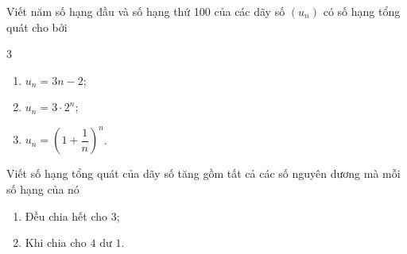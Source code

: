 \begin{bt}%
	Viết năm số hạng đầu và số hạng thứ 100 của các dãy số $\left(u_n\right)$ có số hạng tổng quát cho bởi
	\begin{multicols}{3}
		\begin{enumerate}
			\item  $u_n=3 n-2$;
			\item  $u_n=3 \cdot 2^n$;
			\item  $u_n=\left(1+\dfrac{1}{n}\right)^n$.
		\end{enumerate}
	\end{multicols}
\end{bt}

\begin{bt}%
	Viết số hạng tổng quát của dãy số tăng gồm tất cả các số nguyên dương mà mỗi số hạng của nó
	\begin{enumerate}
		\item Đều chia hết cho $3$;
		\item Khi chia cho $4$ dư $1$.
	\end{enumerate}
\end{bt}

